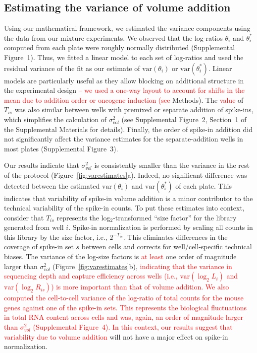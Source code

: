 \documentclass{article}
\newcommand{\suppfignorm}{1}
\newcommand{\suppfigtotals}{2}
\newcommand{\suppfigorder}{3}
\newcommand{\suppfigcell}{4}
\newcommand{\suppsecmath}{1}
\newcommand{\revised}[1]{\textcolor{red}{#1}}
\newcommand\variance{\mbox{var}}
\begin{document}
\subsection*{Estimating the variance of volume addition}
Using our mathematical framework, we estimated the variance components using the data from our mixture experiments.
We observed that the log-ratios $\theta_i$ and $\theta^*_i$ computed from each plate were roughly normally distributed (Supplemental Figure~\suppfignorm{}).
Thus, we fitted a linear model to each set of log-ratios and used the residual variance of the fit as our estimate of $\variance(\theta_i)$ or $\variance(\theta^*_i)$.
Linear models are particularly useful as they allow blocking on additional structure in the experimental design \revised{-- we used a one-way layout to account for shifts in the mean due to addition order or oncogene induction (see} Methods).
The \revised{value} of $T_{is}$ was also similar between wells with premixed or separate addition of spike-ins, which simplifies the calculation of $\sigma^2_{vol}$ (see Supplemental Figure~\suppfigtotals{}, Section~\suppsecmath{} of the Supplemental Materials for details).
Finally, the order of spike-in addition did not significantly affect the variance estimates for the separate-addition wells in most plates (Supplemental Figure~\suppfigorder{}).

Our results indicate that $\sigma^2_{vol}$ is consistently smaller than the variance in the rest of the protocol (Figure~\ref{fig:varestimates}a).
Indeed, no significant difference was detected between the estimated $\variance(\theta_i)$ and $\variance(\theta^*_i)$ of each plate.
This indicates that variability of spike-in volume addition is a minor contributor to the technical variability of the spike-in counts.
To put these estimates into context, consider that $T_{is}$ represents the log$_2$-transformed ``size factor'' for the library generated from well $i$.
Spike-in normalization is performed by scaling all counts in this library by the size factor, i.e., $2^{-T_{is}}$.
This eliminates differences in the coverage of spike-in set $s$ between cells and corrects for well/cell-specific technical biases.
The variance of the log-size factors is \revised{at least} one order of magnitude larger than $\sigma^2_{vol}$ (Figure~\ref{fig:varestimates}b), \revised{indicating that the variance in sequencing depth and capture efficiency across wells (i.e., $\variance{(\log_2 L_{i})}$ and $\variance{(\log_2 R_{is})}$) is more important than that of volume addition.
We also computed the cell-to-cell variance of the log-ratio of total counts for the mouse genes against one of the spike-in sets.
This represents the biological fluctuations in total RNA content across cells and was, again, an order of magnitude larger than $\sigma^2_{vol}$ (Supplemental Figure~\suppfigcell{}).
In this context, our results suggest that variability due to volume addition} will not have a major effect on spike-in normalization.
\end{document}
